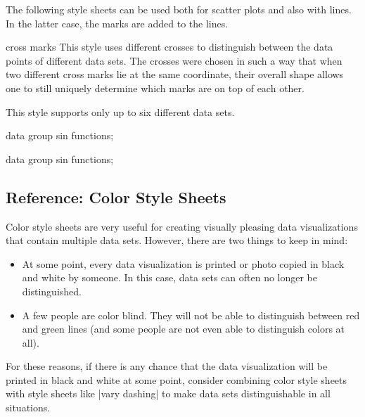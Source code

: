 The following style sheets can be used both for scatter plots and also
with lines. In the latter case, the marks are added to the lines.

\begin{stylesheet}{cross marks}
  This style uses different crosses to distinguish between the data
  points of different data sets. The crosses were chosen in such a way
  that when two different cross marks lie at the same coordinate,
  their overall shape allows one to still uniquely determine which
  marks are on top of each other.

  This style supports only up to six different data sets.
\begin{codeexample}[width=10cm]
\tikz \datavisualization [
  visualize as scatter/.list=
    {1,2,3,4,5,6,7,8},
  example visualization,
  style sheet=cross marks]
data group {sin functions};
\end{codeexample}
\begin{codeexample}[width=10cm]
\tikz \datavisualization [
  visualize as smooth line/.list=
    {1,2,3,4,5,6,7,8},
  example visualization,
  style sheet=cross marks]
data group {sin functions};
\end{codeexample}
\end{stylesheet}


\subsection{Reference: Color Style Sheets}

Color style sheets are very useful for creating visually pleasing data
visualizations that contain multiple data sets. However, there are two
things to keep in mind:

\begin{itemize}
\item At some point, every data visualization is printed or photo
  copied in black and white by someone. In this case, data sets can
  often no longer be distinguished.
\item A few people are color blind. They will not be able to
  distinguish between red and green lines (and some people are not
  even able to distinguish colors at all).
\end{itemize}

For these reasons, if there is any chance that the data visualization
will be printed in black and white at some point, consider combining
color style sheets with style sheets like |vary dashing| to make data
sets distinguishable in all situations.


